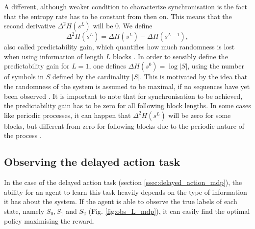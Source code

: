 \documentclass[12pt,a4paper]{article}
\begin{document}
A different, although weaker condition to characterize synchronisation is the fact that the entropy rate has to be constant from then on. This means that the second derivative $\Delta^2 H(s^L)$ will be 0.
We define
\begin{equation}
    \label{eq:predictability_gain}
    \Delta^2 H(s^L) = \Delta H(s^L) - \Delta H(s^{L-1}),
\end{equation}
also called predictability gain, which quantifies how much randomness is lost when using information of length $L$ blocks \autocite{crutchfield2003regularities}.
In order to sensibly define the predictability gain for $L=1$, one defines $\Delta H(s^0) = \log |S|$, using the number of symbols in $S$ defined by the cardinality $|S|$.
This is motivated by the idea that the randomness of the system is assumed to be maximal, if no sequences have yet been observed \autocite{crutchfield2003regularities}.
It is important to note that for synchronisation to be achieved, the predictability gain has to be zero for all following block lengths.
In some cases like periodic processes, it can happen that $\Delta^2 H(s^L)$ will be zero for some blocks, but different from zero for following blocks due to the periodic nature of the process \autocite{crutchfield2003regularities}.

\subsection{Observing the delayed action task} \label{ssec:observing_mdp}
In the case of the delayed action task (section \ref{ssec:delayed_action_mdp}), the ability for an agent to learn this task heavily depends on the type of information it has about the system.
If the agent is able to observe the true labels of each state, namely $S_0, S_1$ and $S_2$ (Fig. \ref{fig:obs_L_mdp}), it can easily find the optimal policy maximising the reward.
\end{document}
